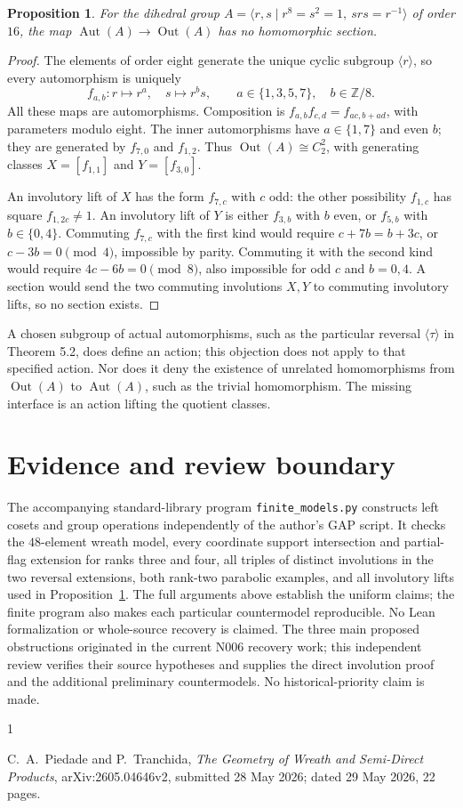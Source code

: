 \documentclass[11pt,a4paper]{article}
\newtheorem{proposition}{Proposition}
\newcommand{\Aut}{\operatorname{Aut}}
\newcommand{\Out}{\operatorname{Out}}
\begin{document}
\begin{proposition}\label{p:outer}
For the dihedral group
$A=\langle r,s\mid r^8=s^2=1,\ srs=r^{-1}\rangle$ of order $16$, the
map $\Aut(A)\to\Out(A)$ has no homomorphic section.
\end{proposition}
\begin{proof}
The elements of order eight generate the unique cyclic subgroup
$\langle r\rangle$, so every automorphism is uniquely
\[
 f_{a,b}: r\mapsto r^a,\quad s\mapsto r^b s,
 \qquad a\in\{1,3,5,7\},\quad b\in\mathbb Z/8.
\]
All these maps are automorphisms. Composition is
$f_{a,b}f_{c,d}=f_{ac,b+ad}$, with parameters modulo eight.
The inner automorphisms have $a\in\{1,7\}$ and even $b$; they are
generated by $f_{7,0}$ and $f_{1,2}$. Thus $\Out(A)\cong C_2^2$, with
generating classes $X=[f_{1,1}]$ and $Y=[f_{3,0}]$.

An involutory lift of $X$ has the form $f_{7,c}$ with $c$ odd: the other
possibility $f_{1,c}$ has square $f_{1,2c}\ne1$. An involutory lift of
$Y$ is either $f_{3,b}$ with $b$ even, or $f_{5,b}$ with $b\in\{0,4\}$.
Commuting $f_{7,c}$ with the first kind would require
$c+7b=b+3c$, or $c-3b=0\pmod4$, impossible by parity.
Commuting it with the second kind would require
$4c-6b=0\pmod8$, also impossible for odd $c$ and $b=0,4$.
A section would send the two commuting involutions $X,Y$ to commuting
involutory lifts, so no section exists.
\end{proof}
A chosen subgroup of actual automorphisms, such as the particular reversal
$\langle\tau\rangle$ in Theorem 5.2, does define an action; this objection
does not apply to that specified action. Nor does it deny the existence
of unrelated homomorphisms from $\Out(A)$ to $\Aut(A)$, such as the trivial
homomorphism. The missing interface is an action lifting the quotient
classes.

\section{Evidence and review boundary}
The accompanying standard-library program \texttt{finite\_models.py}
constructs left cosets and group operations independently of the author's
GAP script. It checks the $48$-element wreath model, every coordinate
support intersection and partial-flag extension for ranks three and four,
all triples of distinct involutions in the two reversal extensions, both
rank-two parabolic examples, and all involutory lifts used in
Proposition~\ref{p:outer}. The full arguments above establish the uniform
claims; the finite program also makes each particular countermodel
reproducible. No Lean formalization or whole-source recovery is claimed.
The three main proposed obstructions originated in the current N006
recovery work; this independent review verifies their source hypotheses
and supplies the direct involution proof and the additional preliminary
countermodels. No historical-priority claim is made.

\begin{thebibliography}{1}
\raggedright
{} C.~A.~Piedade and P.~Tranchida,
\emph{The Geometry of Wreath and Semi-Direct Products},
arXiv:2605.04646v2, submitted 28 May 2026; dated 29 May 2026, 22 pages.
\end{thebibliography}
\end{document}
